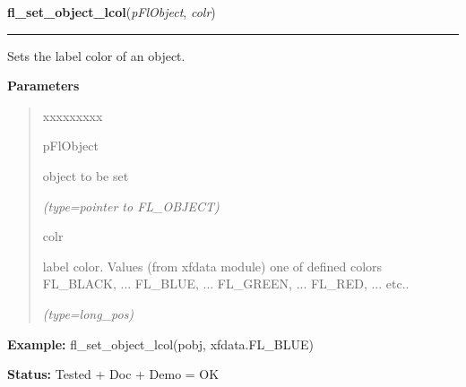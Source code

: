 \hspace{.8\funcindent}\begin{boxedminipage}{\funcwidth}

    \raggedright \textbf{fl\_set\_object\_lcol}(\textit{pFlObject}, \textit{colr})

    \vspace{-1.5ex}

    \rule{\textwidth}{0.5\fboxrule}
\setlength{\parskip}{2ex}
    Sets the label color of an object.

\setlength{\parskip}{1ex}
      \textbf{Parameters}
      \vspace{-1ex}

      \begin{quote}
        \begin{Ventry}{xxxxxxxxx}

          \item[pFlObject]

          object to be set

            {\it (type=pointer to FL\_OBJECT)}

          \item[colr]

          label color. Values (from xfdata module) one of defined colors 
          FL\_BLACK, ... FL\_BLUE, ... FL\_GREEN, ... FL\_RED, ... etc..

            {\it (type=long\_pos)}

        \end{Ventry}

      \end{quote}

\textbf{Example:} fl\_set\_object\_lcol(pobj, xfdata.FL\_BLUE)



\textbf{Status:} Tested + Doc + Demo = OK



    \end{boxedminipage}

    \label{xformslib:flbasic:fl_set_object_lcol}

    \vspace{0.5ex}

